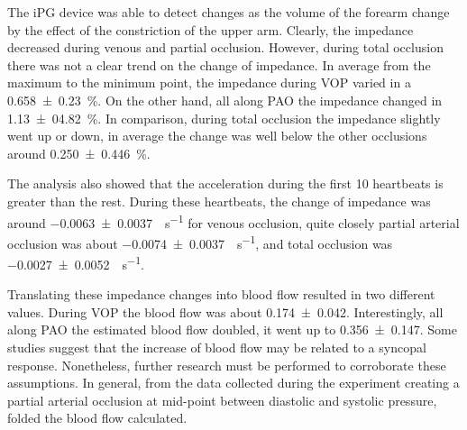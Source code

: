 \label{section occlusion 3}
The iPG device was able to detect changes as the volume of the forearm change by the effect of the constriction of the upper arm. Clearly, the impedance decreased during venous and partial occlusion. However, during total occlusion there was not a clear trend on the change of impedance. In average from the maximum to the minimum point, the impedance during VOP varied in a \SI{0.658(0230)}{\percent}. On the other hand, all along PAO the impedance changed in \SI{1.13(0482)}{\percent}. In comparison, during total occlusion the impedance slightly went up or down, in average the change was well below the other occlusions around \SI{0.250(0446)}{\percent}. 

The analysis also showed that the acceleration during the first 10 heartbeats is greater than the rest. During these heartbeats, the change of impedance was around \SI{-0.0063(00037)}{\Omega \per \second} for venous occlusion, quite closely partial arterial occlusion was about \SI{-0.0074(00037)}{\Omega \per \second}, and total occlusion was \SI{-0.0027(00052)}{\Omega \per \second}. 


Translating these impedance changes into blood flow resulted in two different values. During VOP the blood flow was about \SI{0.174(0042)}{\bfv}. Interestingly, all along PAO the estimated blood flow doubled, it went up to \SI{0.356(0147)}{\bfv}. Some studies \cite{joyner2001belfast, hainsworth2003syncope} suggest that the increase of blood flow may be related to a syncopal response. Nonetheless, further research must be performed to corroborate these assumptions.  In general, from the data collected during the experiment creating a partial arterial occlusion at mid-point between diastolic and systolic pressure, folded the blood flow calculated. 

